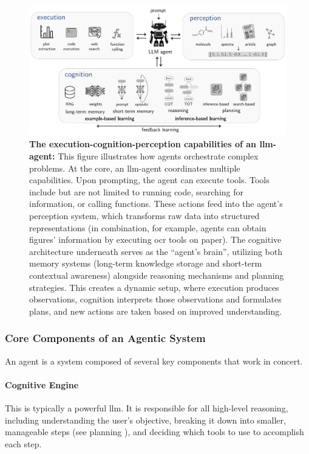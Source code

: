 \begin{figure}[htb]
    \centering
    \includegraphics[width=1\textwidth]{figures/rescaled_figures/chemrev_figure7.pdf}
    \caption{\textbf{The execution-cognition-perception capabilities of an \gls{llm}-agent:} This figure illustrates how agents orchestrate complex problems. At the core, an \gls{llm}-agent coordinates multiple capabilities. Upon prompting, the agent can execute tools. Tools include but are not limited to running code, searching for information, or calling functions. These actions feed into the agent's perception system, which transforms raw data into structured representations (in combination, for example, agents can obtain figures' information by executing \gls{ocr} tools on paper). The cognitive architecture underneath serves as the \enquote{agent's brain}, utilizing both memory systems (long-term knowledge storage and short-term contextual awareness) alongside reasoning mechanisms and planning strategies. This creates a dynamic setup, where execution produces observations, cognition interprets those observations and formulates plans, and new actions are taken based on improved understanding.}
    \label{fig:agent-loop}
\end{figure}

\subsubsection{Core Components of an Agentic System}\label{sec:arch_agents}

An agent is a system composed of several key components that work in concert.

\paragraph{Cognitive Engine} This is typically a powerful \gls{llm}. It is responsible for all high-level reasoning, including understanding the user's objective, breaking it down into smaller, manageable steps (see planning ), and deciding which tools to use to accomplish each step.

